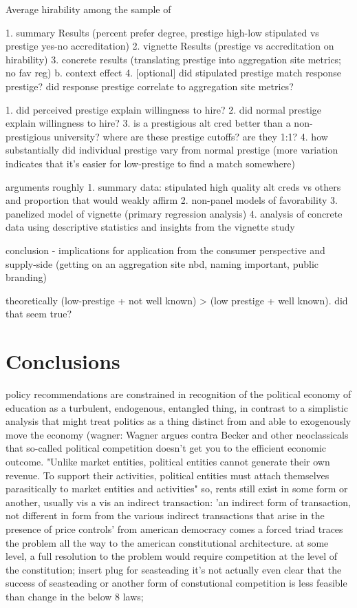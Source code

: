 \documentclass[review]{elsarticle}
\begin{document}



Average hirability among the sample of 

1. summary Results (percent prefer degree, prestige high-low stipulated vs prestige yes-no accreditation)
2. vignette Results (prestige vs accreditation on hirability)
3. concrete results (translating prestige into aggregation site metrics; no fav reg)
    b. context effect
4. [optional] did stipulated prestige match response prestige? did response prestige correlate to aggregation site metrics?

1. did perceived prestige explain willingness to hire?
2. did normal prestige explain willingness to hire?
3. is a prestigious alt cred better than a non-prestigious university? where are these prestige cutoffs? are they 1:1?
4. how substantially did individual prestige vary from normal prestige (more variation indicates that it's easier for low-prestige to find a match somewhere)




arguments roughly
1. summary data: stipulated high quality alt creds vs others and proportion that would weakly affirm
2. non-panel models of favorability
3. panelized model of vignette (primary regression analysis)
4. analysis of concrete data using descriptive statistics and insights from the vignette study

conclusion - implications for application from the consumer perspective and supply-side (getting on an aggregation site nbd, naming important, public branding)

theoretically (low-prestige + not well known) > (low prestige + well known). did that seem true?

\section{Conclusions}

policy recommendations are constrained in recognition of the political economy of education as a turbulent, endogenous, entangled thing,
in contrast to a simplistic analysis that might treat politics as a thing distinct from and able to exogenously move the economy
(wagner: %
Wagner argues contra Becker and other neoclassicals that so-called political competition doesn't get you to the efficient economic outcome.
"Unlike market entities, political entities cannot generate their own revenue.
To support their activities, political entities must attach themselves parasitically to
market entities and activities"
so, rents still exist in some form or another, usually vis a vis an indirect transaction:
'an indirect form of transaction, not different in form from the various indirect transactions that arise in the presence of price controls'
from american democracy comes a forced triad
traces the problem all the way to the american constitutional architecture.
at some level, a full resolution to the problem would require competition at the level of the constitution; insert plug for seasteading
it's not actually even clear that the success of seasteading or another form of constutional competition is less feasible than
change in the below 8 laws;
\end{document}
